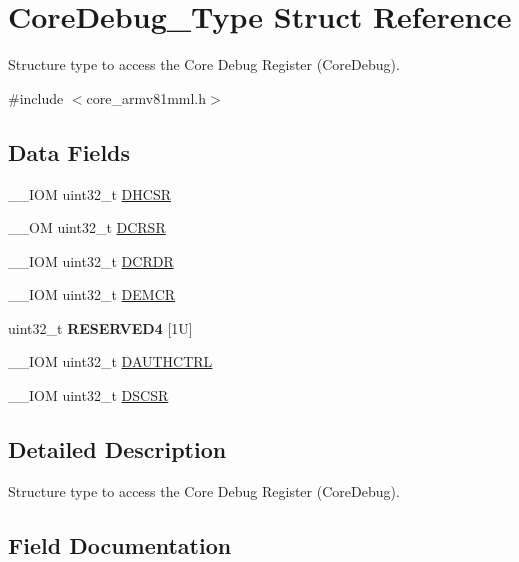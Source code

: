 \hypertarget{struct_core_debug___type}{}\section{Core\+Debug\+\_\+\+Type Struct Reference}
\label{struct_core_debug___type}


Structure type to access the Core Debug Register (Core\+Debug).  




{\ttfamily \#include $<$core\+\_\+armv81mml.\+h$>$}

\subsection*{Data Fields}
\begin{DoxyCompactItemize}
\item 
\+\_\+\+\_\+\+I\+OM uint32\+\_\+t \mbox{\hyperlink{struct_core_debug___type_a94ca828091a9226ab6684fbf30e52909}{D\+H\+C\+SR}}
\item 
\+\_\+\+\_\+\+OM uint32\+\_\+t \mbox{\hyperlink{struct_core_debug___type_ab74a9ec90ad18e4f7a20362d362b754a}{D\+C\+R\+SR}}
\item 
\+\_\+\+\_\+\+I\+OM uint32\+\_\+t \mbox{\hyperlink{struct_core_debug___type_ad1dbd0dd98b6d9327f70545e0081ddbf}{D\+C\+R\+DR}}
\item 
\+\_\+\+\_\+\+I\+OM uint32\+\_\+t \mbox{\hyperlink{struct_core_debug___type_aa99de5f8c609f10c25ed51f57b2edd74}{D\+E\+M\+CR}}
\item 
\mbox{\label{struct_core_debug___type_a1defe18fe95571e383d754b13d3f6c51}} 
uint32\+\_\+t {\bfseries R\+E\+S\+E\+R\+V\+E\+D4} \mbox{[}1\+U\mbox{]}
\item 
\+\_\+\+\_\+\+I\+OM uint32\+\_\+t \mbox{\hyperlink{struct_core_debug___type_a65047e5b8051fa0c84200f8229a155b3}{D\+A\+U\+T\+H\+C\+T\+RL}}
\item 
\+\_\+\+\_\+\+I\+OM uint32\+\_\+t \mbox{\hyperlink{struct_core_debug___type_a2916e1173ded6e0fc26e8445e72a6087}{D\+S\+C\+SR}}
\end{DoxyCompactItemize}


\subsection{Detailed Description}
Structure type to access the Core Debug Register (Core\+Debug). 

\subsection{Field Documentation}
\mbox{\label{struct_core_debug___type_a65047e5b8051fa0c84200f8229a155b3}} 
